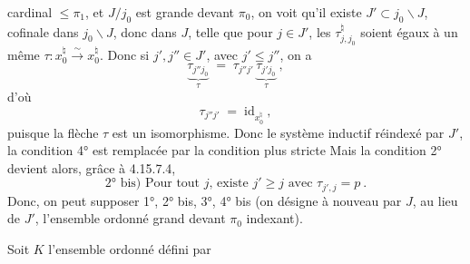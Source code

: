 \documentclass[11pt]{article}
\newcommand{\msp}[1]{\marginpar{\footnotesize [#1]}}
\newcommand{\id}{\mathrm{id}}
\begin{document}
\msp{page 446}
cardinal $\leqslant \pi_1$, et $J/j_0$ est grande devant $\pi_0$, on voit qu'il existe $J' \subset j_0\backslash J$, cofinale dans $j_0\backslash J$, donc dans $J$, telle que pour $j \in J'$, les $\tau^\natural_{j,j_0}$ soient égaux à un même $\tau : x_0^\natural \xrightarrow{\sim} x_0^\natural$. Donc si $j', j'' \in J'$, avec $j' \leqslant j''$, on a
\[
\underbrace{\tau_{j''j_0}}_{\tau} \;=\; \tau_{j''j'}\,\underbrace{\tau_{j'j_0}}_{\tau}\ ,
\]
d'où
\[
\tau_{j''j'} \;=\; \id_{x_0^\natural}\ ,
\]
puisque la flèche $\tau$ est un isomorphisme. Donc le système inductif réindexé par $J'$, la condition 4° est remplacée par la condition plus stricte \fbox{4° bis) $\tau^\natural_{j',j} = \id_{x_0^\natural}$.} Mais la condition 2° devient alors, grâce à 4.15.7.4,
\[
\boxed{\text{2° bis) Pour tout } j\text{, existe } j' \geqslant j \text{ avec } \tau_{j',j} = p}\ .
\]
Donc, on peut supposer 1°, 2° bis, 3°, 4° bis (on désigne à nouveau par $J$, au lieu de $J'$, l'ensemble ordonné grand devant $\pi_0$ indexant).

Soit $K$ l'ensemble ordonné défini par
\end{document}

